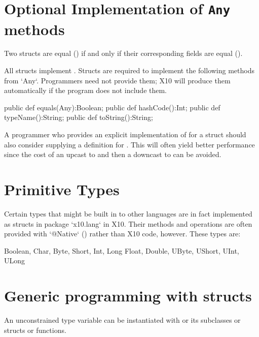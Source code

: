 \section{Optional Implementation of {\tt Any} methods}
\label{StructAnyMethods}

Two
structs are equal (\Xcd{==}) if and only if their corresponding fields
are equal (\Xcd{==}). 

All structs implement . 
Structs are required to implement the following methods from \xcd`Any`.  
Programmers need not provide them; X10 will produce them automatically if 
the program does not include them. 
\begin{xten}
  public def equals(Any):Boolean;
  public def hashCode():Int;
  public def typeName():String;
  public def toString():String;  
\end{xten}


A programmer who provides an explicit implementation
of  for a struct  should also consider
supplying a definition for . This will often
yield better performance since the cost of an upcast to  and
then a downcast to  can be avoided.

\section{Primitive Types}

Certain types that might be built in to other languages are in fact
implemented as structs in package \xcd`x10.lang` in X10. Their methods and
operations are often provided with \xcd`@Native` () rather
than X10 code, however. These types are:
\begin{xten}
Boolean, Char, Byte, Short, Int, Long
Float, Double, UByte, UShort, UInt, ULong
\end{xten}
 
\section{Generic programming with structs}

An unconstrained type variable  can be instantiated with  or
its subclasses or structs or functions.

